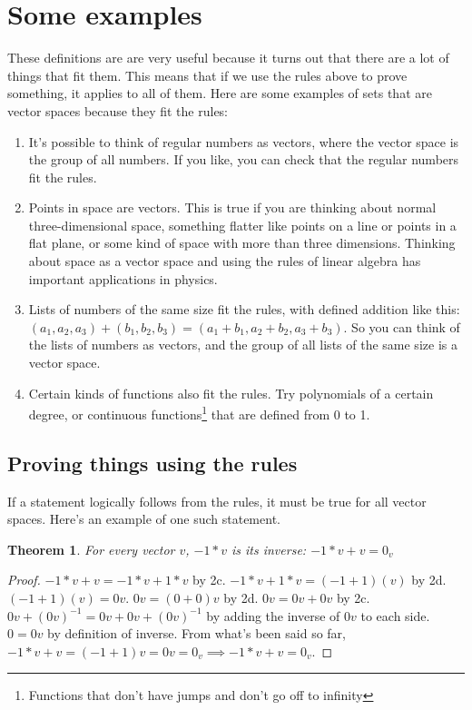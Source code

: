 \documentclass{article}
\newtheorem*{theorem}{Theorem}
\begin{document}
\section{Some examples}
    These definitions are are very useful because it turns out that there are a lot of things that fit them. This means that if we use the rules above to prove something, it applies to all of them. Here are some examples of sets that are vector spaces because they fit the rules:
    \begin{enumerate}
        \item It's possible to think of regular numbers as vectors, where the vector space is the group of all numbers. If you like, you can check that the regular numbers fit the rules.
        \item Points in space are vectors. This is true if you are thinking about normal three-dimensional space, something flatter like points on a line or points in a flat plane, or some kind of space with more than three dimensions. Thinking about space as a vector space and using the rules of linear algebra has important applications in physics.
        \item Lists of numbers of the same size fit the rules, with defined addition like this: $(a_1, a_2, a_3) + (b_1, b_2, b_3) = (a_1 + b_1, a_2 + b_2, a_3 + b_3)$. So you can think of the lists of numbers as vectors, and the group of all lists of the same size is a vector space.
        \item Certain kinds of functions also fit the rules. Try polynomials of a certain degree, or continuous functions\footnote{Functions that don't have jumps and don't go off to infinity} that are defined from 0 to 1.
    \end{enumerate}
    \subsection{Proving things using the rules}
        If a statement logically follows from the rules, it must be true for all vector spaces. Here's an example of one such statement.
        \begin{theorem}
            For every vector $v$, $-1*v$ is its inverse: $-1*v + v = 0_v$
        \end{theorem}
        \begin{proof}
            $-1*v + v = -1*v + 1*v $ by 2c. $-1*v + 1*v = (-1 + 1)(v)$ by 2d. $(-1 + 1 )(v) = 0v$. $0v =  (0 + 0)v$ by 2d. $0v = 0v + 0v$ by 2c. $0v + (0v)^{-1} = 0v + 0v + (0v)^{-1}$ by adding the inverse of $0v$ to each side. $0 = 0v$ by definition of inverse. From what's been said so far, $-1*v + v = (-1 + 1)v = 0v = 0_v \implies -1*v + v = 0_v$.
        \end{proof}
\end{document}
